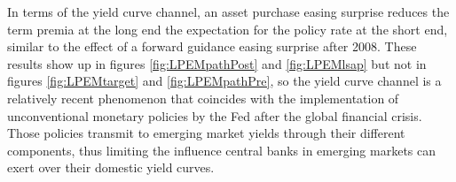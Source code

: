 {In terms of the yield curve channel, an asset purchase easing surprise reduces the term premia at the long end the expectation for the policy rate at the short end, similar to the effect of a forward guidance easing surprise after 2008.
These results %
show up in figures \ref{fig:LPEMpathPost} and \ref{fig:LPEMlsap} but not in figures \ref{fig:LPEMtarget} and \ref{fig:LPEMpathPre}, %
so the yield curve channel is a relatively recent phenomenon that coincides with the implementation of unconventional monetary policies %
by the Fed after the global financial crisis. Those policies transmit to emerging market yields through their different components, thus limiting the influence central banks in emerging markets can exert over their domestic yield curves.



}
